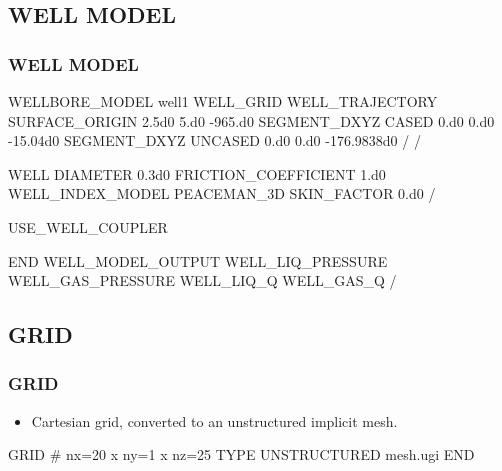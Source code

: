 \documentclass{beamer}
\begin{document}
\subsection{WELL MODEL}
\begin{frame}\frametitle{WELL MODEL}

\begin{semiverbatim}
WELLBORE_MODEL well1
  WELL_GRID
    WELL_TRAJECTORY
      SURFACE_ORIGIN 2.5d0 5.d0 -965.d0
      SEGMENT_DXYZ CASED 0.d0 0.d0 -15.04d0
      SEGMENT_DXYZ UNCASED 0.d0 0.d0 -176.9838d0
    /
  /

\newpage
  WELL
    DIAMETER 0.3d0
    FRICTION_COEFFICIENT 1.d0
    WELL_INDEX_MODEL PEACEMAN_3D
    SKIN_FACTOR 0.d0
  /

  USE_WELL_COUPLER

END
\newpage
WELL_MODEL_OUTPUT
  WELL_LIQ_PRESSURE
  WELL_GAS_PRESSURE
  WELL_LIQ_Q
  WELL_GAS_Q
/

\end{semiverbatim}
\end{frame}
\subsection{GRID}
\begin{frame}\frametitle{GRID}

\begin{itemize}
  \item Cartesian grid, converted to an unstructured implicit mesh.
\end{itemize}

\begin{semiverbatim}
GRID
  # nx=20 x ny=1 x nz=25
  TYPE UNSTRUCTURED mesh.ugi
END
\end{semiverbatim}

\end{frame}
\end{document}
